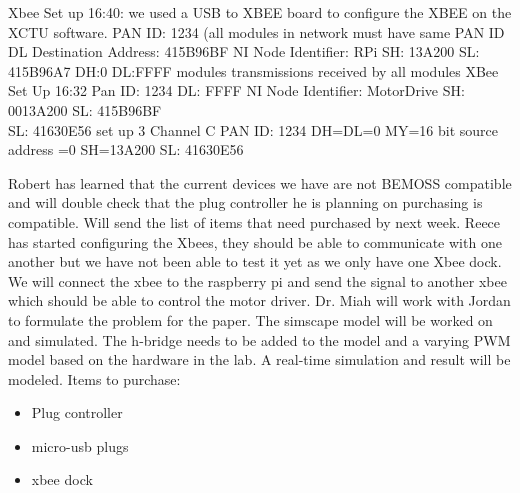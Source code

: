 \documentclass[fontsize=11pt, %
                             paper=letter, %
                             twoside, %
                             captions=tableheading,
                             index=totoc,
                             hyperref]{labbook}
\begin{document}
Xbee Set up 16:40: 
we used a USB to XBEE board to configure the XBEE on the XCTU software. 
\newline PAN ID: 1234 (all modules in network must have same PAN ID
\newline DL Destination Address: 415B96BF
\newline NI Node Identifier: RPi
\newline SH: 13A200
\newline SL: 415B96A7
\newline DH:0
\newline DL:FFFF 
\newline modules transmissions received by all modules 
XBee Set Up 16:32
\newline Pan ID: 1234
\newline DL: FFFF
\newline NI Node Identifier: MotorDrive
\newline SH: 0013A200
\newline SL: 415B96BF\\
SL: 41630E56
\newline set up 3
\newline Channel C
\newline PAN ID: 1234
\newline DH=DL=0
\newline MY=16 bit source address =0
\newline SH=13A200
\newline SL: 41630E56 



Robert has learned that the current devices we have are not BEMOSS compatible and will double check that the plug controller he is planning on purchasing is compatible. Will send the list of items that need purchased by next week.
\newline
\newline
Reece has started configuring the Xbees, they should be able to communicate with one another but we have not been able to test it yet as we only have one Xbee dock.
\newline
\newline
We will connect the xbee to the raspberry pi and send the signal to another xbee which should be able to control the motor driver.
\newline 
\newline
Dr. Miah will work with Jordan to formulate the problem for the paper. The simscape model will be worked on and simulated. The h-bridge needs to be added to the model and a varying PWM model based on the hardware in the lab. A real-time simulation and result will be modeled.
\newline
Items to purchase:
\begin{itemize}
    \item Plug controller
    \item micro-usb plugs
    \item xbee dock
\end{itemize}
\end{document}
